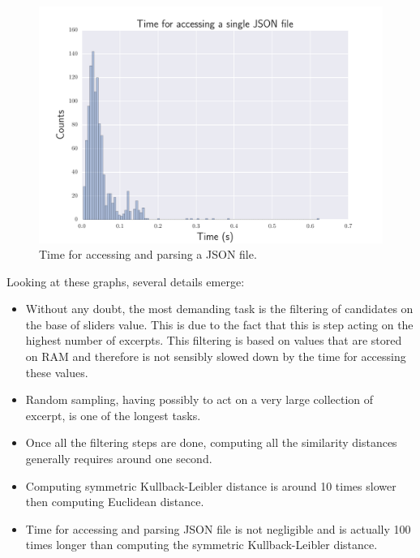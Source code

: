 \begin{figure}[htbp]
\begin{center}
\includegraphics[scale=0.7]{Figures/bench_json_single.pdf}
  \caption[Time for accessing and parsing a JSON file]{Time for accessing and parsing a JSON file.}
  \label{fig:step8}
\end{center}
\end{figure}

Looking at these graphs, several details emerge:
\begin{itemize}
\item Without any doubt, the most demanding task is the filtering of candidates on the base of sliders value. This is due to the fact that this is step acting on the highest number of excerpts. This filtering is based on values that are stored on RAM and therefore is not sensibly slowed down by the time for accessing these values. 
\item Random sampling, having possibly to act on a very large collection of excerpt, is one of the longest tasks.
\item Once all the filtering steps are done, computing all the similarity distances generally requires around one second. 
\item Computing symmetric Kullback-Leibler distance is around 10 times slower then computing Euclidean distance.
\item Time for accessing and parsing JSON file is not negligible and is actually 100 times longer than computing the symmetric Kullback-Leibler distance.
\end{itemize}

